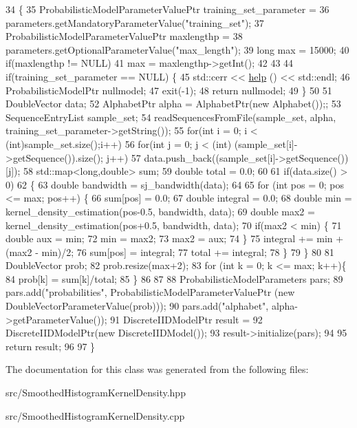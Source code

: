 \begin{DoxyCode}
34   \{
35     ProbabilisticModelParameterValuePtr training\_set\_parameter =
36       parameters.getMandatoryParameterValue(\textcolor{stringliteral}{"training\_set"});
37     ProbabilisticModelParameterValuePtr maxlengthp =
38         parameters.getOptionalParameterValue(\textcolor{stringliteral}{"max\_length"});
39     \textcolor{keywordtype}{long} max = 15000;
40     \textcolor{keywordflow}{if}(maxlengthp != NULL)
41         max = maxlengthp->getInt();
42 
43 
44     \textcolor{keywordflow}{if}(training\_set\_parameter == NULL) \{
45       std::cerr << \hyperlink{classtops_1_1SmoothedHistogramKernelDensity_aab81791e09e0fac51cf4750258fdc161}{help} () << std::endl;
46       ProbabilisticModelPtr nullmodel;
47       exit(-1);
48       \textcolor{keywordflow}{return} nullmodel;
49     \}
50 
51     DoubleVector data;
52     AlphabetPtr alpha = AlphabetPtr(\textcolor{keyword}{new} Alphabet());;
53     SequenceEntryList sample\_set;
54     readSequencesFromFile(sample\_set, alpha, training\_set\_parameter->getString());
55     \textcolor{keywordflow}{for}(\textcolor{keywordtype}{int} i = 0; i < (int)sample\_set.size();i++)
56       \textcolor{keywordflow}{for}(\textcolor{keywordtype}{int} j = 0; j < (int) (sample\_set[i]->getSequence()).size(); j++)
57         data.push\_back((sample\_set[i]->getSequence())[j]);
58     std::map<long,double> sum;
59     \textcolor{keywordtype}{double} total = 0.0;
60 
61     \textcolor{keywordflow}{if}(data.size() > 0)
62       \{
63         \textcolor{keywordtype}{double} bandwidth = sj\_bandwidth(data);
64 
65         \textcolor{keywordflow}{for} (\textcolor{keywordtype}{int} pos = 0; pos <= max; pos++) \{
66           sum[pos] = 0.0;
67           \textcolor{keywordtype}{double} integral = 0.0;
68           \textcolor{keywordtype}{double} min = kernel\_density\_estimation(pos-0.5, bandwidth, data);
69           \textcolor{keywordtype}{double} max2 = kernel\_density\_estimation(pos+0.5, bandwidth, data);
70           \textcolor{keywordflow}{if}(max2 < min) \{
71             \textcolor{keywordtype}{double} aux = min;
72             min = max2;
73             max2 = aux;
74           \}
75           integral += min + (max2 - min)/2;
76           sum[pos] = integral;
77           total += integral;
78         \}
79       \}
80 
81     DoubleVector prob;
82     prob.resize(max+2);
83     \textcolor{keywordflow}{for} (\textcolor{keywordtype}{int} k = 0; k <= max; k++)\{
84       prob[k] =  sum[k]/total;
85     \}
86 
87 
88     ProbabilisticModelParameters pars;
89     pars.add(\textcolor{stringliteral}{"probabilities"}, ProbabilisticModelParameterValuePtr (\textcolor{keyword}{new} DoubleVectorParameterValue(prob)));
90     pars.add(\textcolor{stringliteral}{"alphabet"}, alpha->getParameterValue());
91     DiscreteIIDModelPtr result =
92       DiscreteIIDModelPtr(\textcolor{keyword}{new} DiscreteIIDModel());
93     result->initialize(pars);
94 
95     \textcolor{keywordflow}{return} result;
96 
97   \}
\end{DoxyCode}


The documentation for this class was generated from the following files\+:\begin{DoxyCompactItemize}
\item 
src/Smoothed\+Histogram\+Kernel\+Density.\+hpp\item 
src/Smoothed\+Histogram\+Kernel\+Density.\+cpp\end{DoxyCompactItemize}
